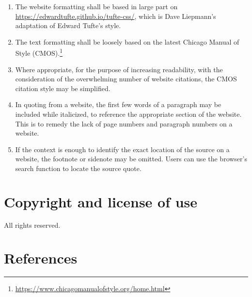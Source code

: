 \documentclass[12pt]{article}
\begin{document}
\begin{enumerate}
	\item The website formatting shall be based in large part on \href{https://edwardtufte.github.io/tufte-css/}{https://edwardtufte.github.io/tufte-css/}, which is Dave Liepmann's adaptation of Edward Tufte's style.
	\item The text formatting shall be loosely based on the latest Chicago Manual of Style (CMOS).\footnote{\href{https://www.chicagomanualofstyle.org/home.html}{https://www.chicagomanualofstyle.org/home.html}}
	\item Where appropriate, for the purpose of increasing readability, with the consideration of the overwhelming number of website citations, the CMOS citation style may be simplified.
	\item In quoting from a website, the first few words of a paragraph may be included while italicized, to reference the appropriate section of the website. This is to remedy the lack of page numbers and paragraph numbers on a website.
	\item If the context is enough to identify the exact location of the source on a website, the footnote or sidenote may be omitted. Users can use the browser's search function to locate the source quote.
\end{enumerate}

\section{Copyright and license of use}

All rights reserved.

\section{References}

\printbibliography[heading=none]

\end{document}
